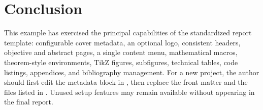 \section{Conclusion}

This example has exercised the principal capabilities of the standardized report template:
configurable cover metadata, an optional logo, consistent headers, objective and abstract pages,
a single content menu, mathematical macros, theorem-style environments, TikZ figures,
subfigures, technical tables, code listings, appendices, and bibliography management. For a new
project, the author should first edit the metadata block in , then replace the front matter and the files listed in
. Unused setup features
may remain available without appearing in the final report.

